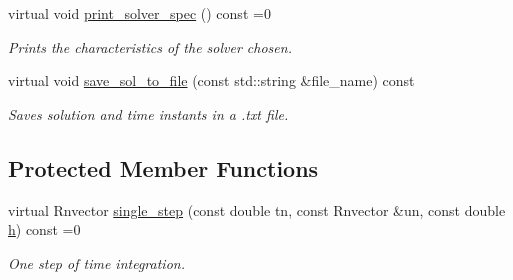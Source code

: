 \begin{DoxyCompactItemize}
\mbox{\label{classBaseSolver_a44725e315b208c0ee69ba8fd5d172e09}} 
virtual void \hyperlink{classBaseSolver_a44725e315b208c0ee69ba8fd5d172e09}{print\+\_\+solver\+\_\+spec} () const =0
\begin{DoxyCompactList}\small\item\em Prints the characteristics of the solver chosen. \end{DoxyCompactList}\item 
\mbox{\label{classBaseSolver_a083167190cdd436c2a5aa60cbb58d904}} 
virtual void \hyperlink{classBaseSolver_a083167190cdd436c2a5aa60cbb58d904}{save\+\_\+sol\+\_\+to\+\_\+file} (const std\+::string \&file\+\_\+name) const
\begin{DoxyCompactList}\small\item\em Saves solution and time instants in a .txt file. \end{DoxyCompactList}\end{DoxyCompactItemize}
\subsection*{Protected Member Functions}
\begin{DoxyCompactItemize}
\item 
\mbox{\label{classBaseSolver_a66b4a8e6b6e0bb2f3564b2df849c79aa}} 
virtual Rnvector \hyperlink{classBaseSolver_a66b4a8e6b6e0bb2f3564b2df849c79aa}{single\+\_\+step} (const double tn, const Rnvector \&un, const double \hyperlink{classBaseSolver_a6dbedd1610b0979379e6acbb0a4093cd}{h}) const =0
\begin{DoxyCompactList}\small\item\em One step of time integration. \end{DoxyCompactList}\end{DoxyCompactItemize}
